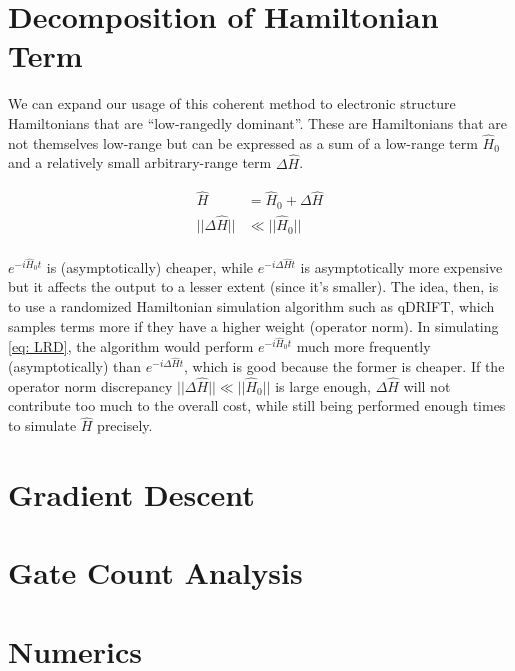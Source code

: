 \section{Decomposition of Hamiltonian Term}

We can expand our usage of this coherent method to electronic structure Hamiltonians that are ``low-rangedly dominant''. These are Hamiltonians that are not themselves low-range but can be expressed as a sum of a low-range term $\hat{H}_0$ and a relatively small arbitrary-range term $\Delta \hat{H}$.

\begin{equation}
    \begin{split}
        \hat{H} &= \hat{H}_0 + \Delta \hat{H} \\
        ||\Delta \hat{H}|| &\ll ||\hat{H}_0|| \\
    \end{split}
    \label{eq: LRD}
\end{equation}

$e^{-i\hat{H}_0t}$ is (asymptotically) cheaper, while $e^{-i\Delta \hat{H}t}$ is asymptotically more expensive but it affects the output to a lesser extent (since it's smaller). The idea, then, is to use a randomized Hamiltonian simulation algorithm such as qDRIFT, which samples terms more if they have a higher weight (operator norm). In simulating \eqref{eq: LRD}, the algorithm would perform $e^{-i\hat{H}_0t}$ much more frequently (asymptotically) than $e^{-i\Delta \hat{H}t}$, which is good because the former is cheaper. If the operator norm discrepancy $||\Delta \hat{H}|| \ll ||\hat{H}_0||$ is large enough, $\Delta \hat{H}$ will not contribute too much to the overall cost, while still being performed enough times to simulate $\hat{H}$ precisely.


\section{Gradient Descent}
\section{Gate Count Analysis}
\section{Numerics}



